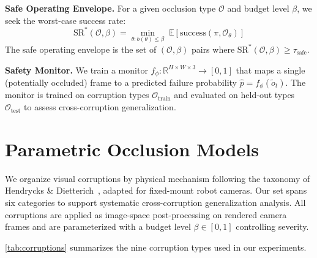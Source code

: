 \documentclass[letterpaper]{IEEEtran}
\begin{document}
\noindent\textbf{Safe Operating Envelope.}
For a given occlusion type $\mathcal{O}$ and budget level $\beta$, we seek the worst-case success rate:
\begin{equation}
    \text{SR}^*(\mathcal{O}, \beta) = \min_{\theta : b(\theta) \leq \beta} \; \mathbb{E}\left[\text{success}(\pi, \mathcal{O}_\theta)\right]
\label{eq:envelope}
\end{equation}
The safe operating envelope is the set of $(\mathcal{O}, \beta)$ pairs where $\text{SR}^*(\mathcal{O}, \beta) \geq \tau_{\text{safe}}$.

\noindent\textbf{Safety Monitor.}
We train a monitor $f_\phi: \mathbb{R}^{H \times W \times 3} \to [0, 1]$ that maps a single (potentially occluded) frame to a predicted failure probability $\hat{p} = f_\phi(\tilde{o}_t)$.
The monitor is trained on corruption types $\mathcal{O}_{\text{train}}$ and evaluated on held-out types $\mathcal{O}_{\text{test}}$ to assess cross-corruption generalization.

\section{Parametric Occlusion Models}
\label{sec:occlusion}

We organize visual corruptions by physical mechanism following the taxonomy of Hendrycks \& Dietterich~\cite{hendrycks2019}, adapted for fixed-mount robot cameras.
Our set spans six categories to support systematic cross-corruption generalization analysis.
All corruptions are applied as image-space post-processing on rendered camera frames and are parameterized with a budget level $\beta \in [0, 1]$ controlling severity.

\cref{tab:corruptions} summarizes the nine corruption types used in our experiments.
\end{document}
